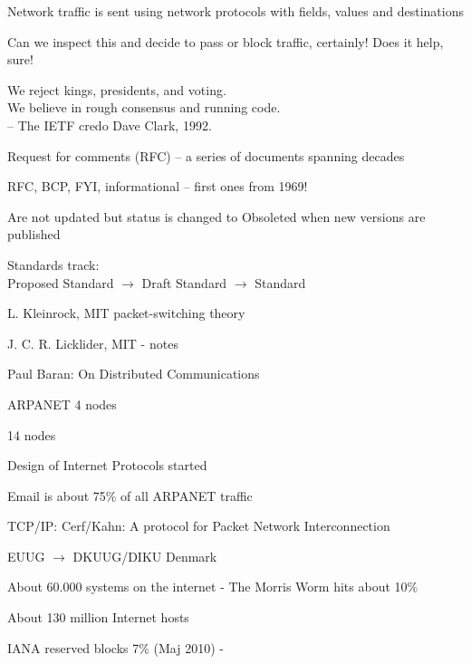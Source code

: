 \documentclass[Screen16to9,17pt]{foils}
\begin{document}



\begin{list2}
\item Network traffic is sent using network protocols with fields, values and destinations
\item Can we inspect this and decide to pass or block traffic, certainly! Does it help, sure!
\end{list2}





{\hlkbig \color{titlecolor}
We reject kings, presidents, and voting.\\
We believe in rough consensus and running code.\\
-- The IETF credo Dave Clark, 1992.}

\begin{list1}
\item Request for comments (RFC) -- a series of documents spanning decades
\item RFC, BCP, FYI, informational -- first ones from 1969!
\item Are not updated but status is changed to Obsoleted when new versions are published
\item Standards track:\\
Proposed Standard $\rightarrow$ Draft Standard $\rightarrow$ Standard
\end{list1}


\begin{list2}
\item[1961]  L. Kleinrock, MIT packet-switching theory
\item[1962]  J. C. R. Licklider, MIT - notes
\item[1964]  Paul Baran: On Distributed Communications
\item[1969]  ARPANET 4 nodes
\item[1971]  14 nodes
\item[1973]  Design of Internet Protocols started
\item[1973]  Email is about 75\% of all ARPANET traffic
\item[1974]  TCP/IP: Cerf/Kahn: A protocol for Packet
        Network Interconnection
\item[1983]  EUUG $\rightarrow$ DKUUG/DIKU Denmark
\item[1988]  About 60.000 systems on the internet -
        The Morris Worm hits about 10\%
\item[2002] About 130 million Internet hosts
\item[2010] IANA reserved blocks 7\% (Maj 2010) - 
\end{list2}
\end{document}
